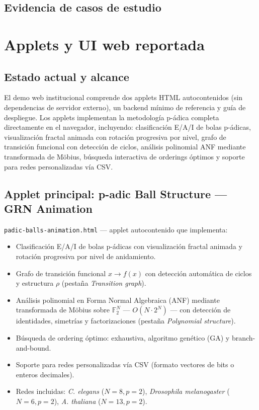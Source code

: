 \documentclass[11pt]{article}
\begin{document}
\subsection{Evidencia de casos de estudio}

\section{Applets y UI web reportada}
\subsection{Estado actual y alcance}
El demo web institucional comprende dos applets HTML autocontenidos (sin dependencias de servidor externo), un backend mínimo de referencia y guía de despliegue. Los applets implementan la metodología p-ádica completa directamente en el navegador, incluyendo: clasificación E/A/I de bolas p-ádicas, visualización fractal animada con rotación progresiva por nivel, grafo de transición funcional con detección de ciclos, análisis polinomial ANF mediante transformada de Möbius, búsqueda interactiva de orderings óptimos y soporte para redes personalizadas vía CSV.

\subsection{Applet principal: p-adic Ball Structure — GRN Animation}
\texttt{padic-balls-animation.html} — applet autocontenido que implementa:
\begin{itemize}
  \item Clasificación E/A/I de bolas p-ádicas con visualización fractal animada y rotación progresiva por nivel de anidamiento.
  \item Grafo de transición funcional $x \to f(x)$ con detección automática de ciclos y estructura $\rho$ (pestaña \emph{Transition graph}).
  \item Análisis polinomial en Forma Normal Algebraica (ANF) mediante transformada de Möbius sobre $\mathbb{F}_2^N$ — $O(N \cdot 2^N)$ — con detección de identidades, simetrías y factorizaciones (pestaña \emph{Polynomial structure}).
  \item Búsqueda de ordering óptimo: exhaustiva, algoritmo genético (GA) y branch-and-bound.
  \item Soporte para redes personalizadas vía CSV (formato vectores de bits o enteros decimales).
  \item Redes incluidas: \textit{C. elegans} ($N=8, p=2$), \textit{Drosophila melanogaster} ($N=6, p=2$), \textit{A. thaliana} ($N=13, p=2$).
\end{itemize}
\end{document}
